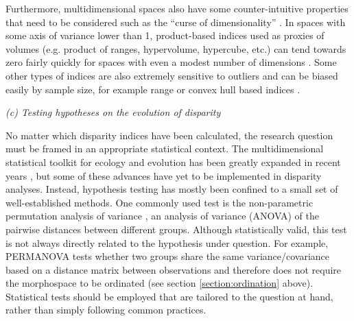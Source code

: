\documentclass[12pt,letterpaper]{article}
\renewcommand{\subsection}[1]{%
\bigskip
\begin{center}
\begin{large}
\normalfont\itshape #1
\end{large}
\end{center}}
\begin{document}
Furthermore, multidimensional spaces also have some counter-intuitive properties that need to be considered such as the ``curse of dimensionality'' \citep{Bellman1966-mc}.
In spaces with some axis of variance lower than 1, product-based indices used as proxies of volumes (e.g. product of ranges, hypervolume, hypercube, etc.) can tend towards zero fairly quickly for spaces with even a modest number of dimensions \citep{Bellman1966-mc}.
Some other types of indices are also extremely sensitive to outliers and can be biased easily by sample size, for example range \citep{Foote1992-zs} or convex hull based indices \citep{Jackson2011-kq}.

\subsection{(c) Testing hypotheses on the evolution of disparity}
\label{section:testing}

No matter which disparity indices have been calculated, the research question must be framed in an appropriate statistical context.
The multidimensional statistical toolkit for ecology and evolution has been greatly expanded in recent years \citep{clavel2015mvmorph, Adams2018-mg}, but some of these advances have yet to be implemented in disparity analyses. Instead, hypothesis testing has mostly been confined to a small set of well-established methods.
One commonly used test is the non-parametric permutation analysis of variance \citep{Anderson2001-qb, Anderson2013-zt}, an analysis of variance (ANOVA) of the pairwise distances between different groups.
Although statistically valid, this test is not always directly related to the hypothesis under question.
For example, PERMANOVA tests whether two groups share the same variance/covariance based on a distance matrix between observations and therefore does not require the morphospace to be ordinated (see section \ref{section:ordination} above).
Statistical tests should be employed that are tailored to the question at hand, rather than simply following common practices.
\end{document}
